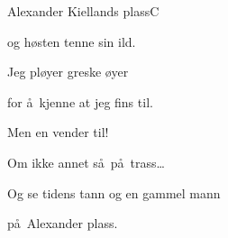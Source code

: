 \begin{SBSong}{Alexander Kiellands plass}{C}
\begin{SBVerse}
    og  h\o sten tenne sin ild.

    Jeg pl\o yer greske \o yer

    for \aa\ kjenne at jeg fins til.

    Men en  vender til!

    Om ikke annet s\aa\ p\aa\ trass\ldots

    Og se tidens tann og en gammel mann

    p\aa\ Alexander  plass. 
  \end{SBVerse}
\end{SBSong}
